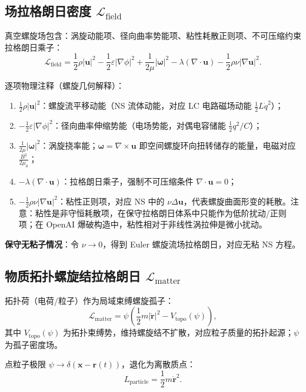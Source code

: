 \documentclass[11pt]{ctexart}
\newcommand{\ve}[1]{\bm{#1}}                         %
\newcommand{\Lf}{\mathcal{L}_{\mathrm{field}}}       %
\newcommand{\Lm}{\mathcal{L}_{\mathrm{matter}}}      %
\newcommand{\Vtopo}{V_{\mathrm{topo}}}               %
\begin{document}
\subsection{场拉格朗日密度 $\Lf$}

真空螺旋场包含：涡旋动能项、径向曲率势能项、粘性耗散正则项、不可压缩约束拉格朗日乘子：
\begin{equation}
\Lf
=\frac{1}{2}\rho|\ve{u}|^{2}
-\frac{1}{2}\varepsilon|\nabla\phi|^{2}
+\frac{1}{2\mu}|\ve{\omega}|^{2}
-\lambda(\nabla\cdot\ve{u})
-\frac{1}{2}\rho\nu|\nabla\ve{u}|^{2}.
\label{eq:Lfield}
\end{equation}

逐项物理注释（螺旋几何解释）：
\begin{enumerate}
\item $\frac{1}{2}\rho|\ve{u}|^{2}$：螺旋流平移动能（NS 流体动能，对应 LC 电路磁场动能 $\tfrac12 L\dot{q}^{2}$）；
\item $-\frac{1}{2}\varepsilon|\nabla\phi|^{2}$：径向曲率伸缩势能（电场势能，对偶电容储能 $\tfrac12 q^{2}/C$）；
\item $\frac{1}{2\mu}|\ve{\omega}|^{2}$：涡旋挠率能；$\ve{\omega}=\nabla\times\ve{u}$ 即空间螺旋环向扭转储存的能量，电磁对应 $\frac{B^{2}}{2\mu_0}$；
\item $-\lambda(\nabla\cdot\ve{u})$：拉格朗日乘子，强制不可压缩条件 $\nabla\cdot\ve{u}=0$；
\item $-\frac{1}{2}\rho\nu|\nabla\ve{u}|^{2}$：粘性正则项，对应 NS 中的 $\nu\Delta\ve{u}$，代表螺旋曲面形变的耗散。注意：粘性是非守恒耗散项，在保守拉格朗日体系中只能作为低阶扰动/正则项；在 OpenAI 爆破构造中，粘性相对于非线性涡拉伸是微小扰动。
\end{enumerate}

\noindent\textbf{保守无粘子情况}：令 $\nu\to0$，得到 Euler 螺旋流场拉格朗日，对应无粘 NS 方程。

\subsection{物质拓扑螺旋结拉格朗日 $\Lm$}

拓扑荷（电荷/粒子）作为局域束缚螺旋孤子：
\begin{equation}
\Lm=\psi\left(\frac{1}{2}m|\dot{\ve{r}}|^{2}-\Vtopo(\psi)\right),
\label{eq:Lmatter}
\end{equation}
其中 $\Vtopo(\psi)$ 为拓扑束缚势，维持螺旋结不扩散，对应粒子质量的拓扑起源；$\psi$ 为孤子密度场。

点粒子极限 $\psi\to\delta(\ve{x}-\ve{r}(t))$，退化为离散质点：
\begin{equation}
L_{\mathrm{particle}}=\frac{1}{2}m\dot{\ve{r}}^{2}.
\label{eq:Lparticle}
\end{equation}
\end{document}
